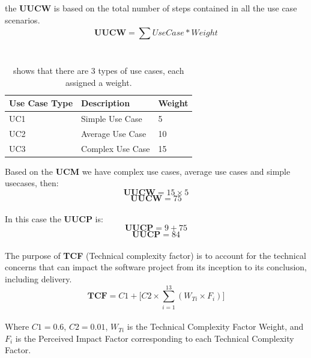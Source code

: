 \documentclass[12pt]{article}
\begin{document}
the \textbf{UUCW} is based on the total number of steps contained in all the use case scenarios.
\begin{equation}
    \textbf{UUCW} = \sum^{}_{}{UseCase * Weight}
\end{equation}\\
\begin{table}[h]
\centering
\caption{shows that there are 3 types of use cases, each assigned a weight. }
\begin{tabular}{|l|l|l|}
\hline
\textbf{Use Case Type} & \textbf{Description} & \textbf{Weight} \\ \hline
UC1                    & Simple Use Case      & 5               \\ \hline
UC2                    & Average Use Case     & 10              \\ \hline
UC3                    & Complex Use Case     & 15              \\ \hline
\end{tabular}
\end{table}
Based on the \textbf{UCM} we have complex use cases, average use cases and simple usecases, then:
\begin{equation}
    \textbf{UUCW} = 15 \times 5
\end{equation}
\begin{equation}
    \textbf{UUCW} = 75
\end{equation}\\

In this case the \textbf{UUCP} is:
\begin{equation}
    \textbf{UUCP} = 9 + 75
\end{equation}
\begin{equation}
    \textbf{UUCP} = 84
\end{equation}\\

The purpose of \textbf{TCF} (Technical complexity factor) is to account for the technical concerns that can impact the software project from its inception to its conclusion, including delivery.
\begin{equation}
    \textbf{TCF} = C1 + \Bigg[C2 \times \sum^{13}_{i=1}{(W_{Ti} \times F_{i})\Bigg]} 
\end{equation}\\
Where $C1 = 0.6$, $C2 = 0.01$, $W_{Ti}$ is the Technical Complexity Factor Weight, and $F_{i}$ is the Perceived Impact Factor corresponding to each Technical Complexity Factor. 
\end{document}
